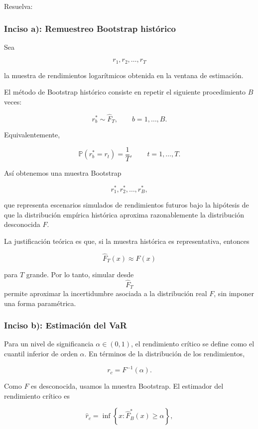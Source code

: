 \documentclass[
]{article}
\begin{document}
Resuelva:

\subsubsection{Inciso a): Remuestreo Bootstrap
histórico}\label{inciso-a-remuestreo-bootstrap-histuxf3rico}

Sea

\[
r_1,r_2,\ldots,r_T
\]

la muestra de rendimientos logarítmicos obtenida en la ventana de
estimación.

El método de Bootstrap histórico consiste en repetir el siguiente
procedimiento \(B\) veces:

\[
r_b^* \sim \widehat F_T,
\qquad b=1,\ldots,B.
\]

Equivalentemente,

\[
\mathbb P(r_b^* = r_t) = \frac{1}{T},
\qquad t=1,\ldots,T.
\]

Así obtenemos una muestra Bootstrap

\[
r_1^*,r_2^*,\ldots,r_B^*,
\]

que representa escenarios simulados de rendimientos futuros bajo la
hipótesis de que la distribución empírica histórica aproxima
razonablemente la distribución desconocida \(F\).

La justificación teórica es que, si la muestra histórica es
representativa, entonces

\[
\widehat F_T(x) \approx F(x)
\]

para \(T\) grande. Por lo tanto, simular desde \[\widehat F_T\] permite
aproximar la incertidumbre asociada a la distribución real \(F\), sin
imponer una forma paramétrica.

\subsubsection{Inciso b): Estimación del
VaR}\label{inciso-b-estimaciuxf3n-del-var}

Para un nivel de significancia \(\alpha \in (0,1)\), el rendimiento
crítico se define como el cuantil inferior de orden \(\alpha\). En
términos de la distribución de los rendimientos,

\[
r_c = F^{-1}(\alpha).
\]

Como \(F\) es desconocida, usamos la muestra Bootstrap. El estimador del
rendimiento crítico es

\[
\widehat r_c
=
\inf\left\{
x:
\widehat F_B^*(x)\geq \alpha
\right\},
\]
\end{document}
